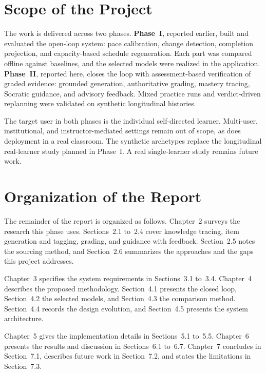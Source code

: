 \section{Scope of the Project}
The work is delivered across two phases. \textbf{Phase~I}, reported earlier, built and evaluated the open-loop system: pace calibration, change detection, completion projection, and capacity-based schedule regeneration. Each part was compared offline against baselines, and the selected models were realized in the application. \textbf{Phase~II}, reported here, closes the loop with assessment-based verification of graded evidence: grounded generation, authoritative grading, mastery tracing, Socratic guidance, and advisory feedback. Mixed practice runs and verdict-driven replanning were validated on synthetic longitudinal histories.

The target user in both phases is the individual self-directed learner. Multi-user, institutional, and instructor-mediated settings remain out of scope, as does deployment in a real classroom. The synthetic archetypes replace the longitudinal real-learner study planned in Phase~I. A real single-learner study remains future work.

\section{Organization of the Report}
The remainder of the report is organized as follows. Chapter~2 surveys the research this phase uses. Sections~2.1 to~2.4 cover knowledge tracing, item generation and tagging, grading, and guidance with feedback. Section~2.5 notes the sourcing method, and Section~2.6 summarizes the approaches and the gaps this project addresses.

Chapter~3 specifies the system requirements in Sections~3.1 to~3.4. Chapter~4 describes the proposed methodology. Section~4.1 presents the closed loop, Section~4.2 the selected models, and Section~4.3 the comparison method. Section~4.4 records the design evolution, and Section~4.5 presents the system architecture.

Chapter~5 gives the implementation details in Sections~5.1 to~5.5. Chapter~6 presents the results and discussion in Sections~6.1 to~6.7. Chapter~7 concludes in Section~7.1, describes future work in Section~7.2, and states the limitations in Section~7.3.
